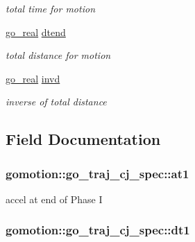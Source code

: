 \begin{DoxyCompactItemize}
\begin{DoxyCompactList}\small\item\em total time for motion \end{DoxyCompactList}\item 
\hyperlink{gotypes_8h_afd666a2393eebd71ee455846ac9def9b}{go\-\_\-real} \hyperlink{structgomotion_1_1go__traj__cj__spec_a89238023b9a1f80d4b4b7fa5b38967ce}{dtend}
\begin{DoxyCompactList}\small\item\em total distance for motion \end{DoxyCompactList}\item 
\hyperlink{gotypes_8h_afd666a2393eebd71ee455846ac9def9b}{go\-\_\-real} \hyperlink{structgomotion_1_1go__traj__cj__spec_a00a890b5f1f58c05c7ec7d30c92712d6}{invd}
\begin{DoxyCompactList}\small\item\em inverse of total distance \end{DoxyCompactList}\end{DoxyCompactItemize}


\subsection{Field Documentation}
\hypertarget{structgomotion_1_1go__traj__cj__spec_ae63aa2315ba83e5110d79408db7666a8}{
\subsubsection[{at1}]{ gomotion\-::go\-\_\-traj\-\_\-cj\-\_\-spec\-::at1}}\label{structgomotion_1_1go__traj__cj__spec_ae63aa2315ba83e5110d79408db7666a8}


accel at end of Phase I 

\hypertarget{structgomotion_1_1go__traj__cj__spec_a27c49ef9ca002d4d1b5eeb66138a609a}{
\subsubsection[{dt1}]{ gomotion\-::go\-\_\-traj\-\_\-cj\-\_\-spec\-::dt1}}\label{structgomotion_1_1go__traj__cj__spec_a27c49ef9ca002d4d1b5eeb66138a609a}


